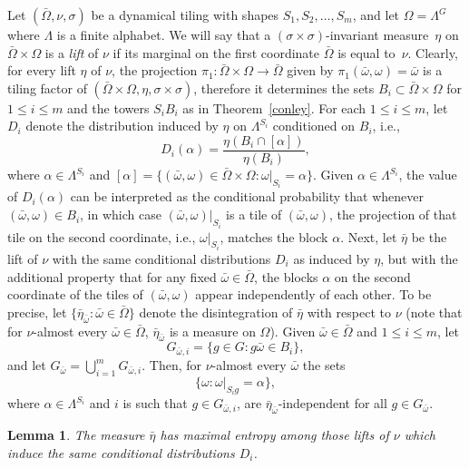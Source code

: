 \documentclass{amsart}
\newtheorem{lem}[thm]{Lemma}
\theoremstyle{remark}
\def \im {invariant measure}
\begin{document}
 Let $(\bar\Omega,\nu,\sigma)$ be a dynamical tiling with shapes $S_1,S_2,\dots,S_m$, and let $\Omega=\Lambda^G$ where $\Lambda$ is a finite alphabet. We will say that a $(\sigma\times\sigma)$-\im\ $\eta$ on $\bar\Omega\times\Omega$ is a \emph{lift} of $\nu$ if its marginal on the first coordinate $\bar\Omega$ is equal to~$\nu$. Clearly, for every lift $\eta$ of $\nu$, the projection $\pi_1:\bar\Omega\times\Omega\to\bar\Omega$ given by $\pi_1(\bar\omega,\omega)=\bar\omega$ is a tiling factor of $(\bar\Omega\times\Omega,\eta,\sigma\times\sigma)$, therefore it determines the sets $B_i\subset\bar\Omega\times\Omega$ for $1\le i\le m$ and the towers $S_iB_i$ as in Theorem~\ref{conley}. For each $1\le i\le m$, let $D_i$ denote the distribution induced by $\eta$ on $\Lambda^{S_i}$ conditioned on $B_i$, i.e.,
$$
D_i(\alpha) = \frac{\eta(B_i\cap[\alpha])}{\eta(B_i)}, 
$$
where $\alpha\in\Lambda^{S_i}$ and 
$[\alpha]=\{(\bar\omega,\omega)\in\bar\Omega\times\Omega:\omega|_{S_i}=\alpha\}$. Given $\alpha\in\Lambda^{S_i}$, the value of $D_i(\alpha)$ can be interpreted as the conditional probability that whenever $(\bar\omega,\omega)\in B_i$, in which case $(\bar\omega,\omega)|_{S_i}$ is a tile of $(\bar\omega,\omega)$, the projection of that tile on the second coordinate, i.e., $\omega|_{S_i}$, matches the block $\alpha$.
Next, let $\bar\eta$ be the lift of $\nu$ with the same conditional distributions $D_i$ as induced by $\eta$, but with the additional property that for any fixed $\bar\omega\in\bar\Omega$, the blocks $\alpha$ on the second coordinate of the tiles of $(\bar\omega,\omega)$ appear independently of each other. To be precise, let $\{\bar\eta_{\bar\omega}:\bar\omega\in\bar\Omega\}$ denote the disintegration of $\bar\eta$ with respect to $\nu$ (note that for $\nu$-almost every $\bar\omega\in\bar\Omega$, $\bar\eta_{\bar\omega}$ is a measure on $\Omega$). Given $\bar\omega\in\bar\Omega$ and $1\le i\le m$, let
$$
G_{\bar\omega,i}=\{g\in G: g\bar\omega\in B_i\}, 
$$
and let $G_{\bar\omega}=\bigcup_{i=1}^m G_{\bar\omega,i}$.
Then, for $\nu$-almost every $\bar\omega$ the sets 
$$
\{\omega:\omega|_{S_ig}=\alpha\},
$$
where $\alpha\in\Lambda^{S_i}$ and $i$ is such that $g\in G_{\bar\omega,i}$,
are $\bar\eta_{\bar\omega}$-independent for all $g\in G_{\bar\omega}$.

\begin{lem}\label{max}The measure $\bar\eta$ has maximal entropy among those lifts of $\nu$
which induce the same conditional distributions $D_i$.
\end{lem}
\end{document}
